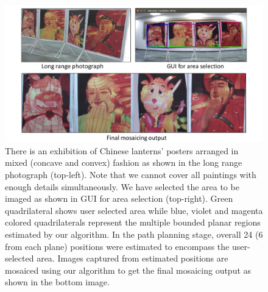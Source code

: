 \begin{figure}
\centering
\includegraphics[width=\linewidth]{figures/multiplanar/mixed2Result.pdf}
\caption[Result: Mixed arrangement]{There is an exhibition of Chinese lanterns'
posters arranged in mixed (concave and convex) fashion as shown in the long range photograph
(top-left). Note that we cannot cover all paintings with enough details
simultaneously. We have selected the area to be imaged as shown in GUI for
area selection (top-right). Green quadrilateral shows user selected area while
blue, violet and magenta colored quadrilaterals represent the multiple
bounded planar regions estimated by our algorithm. In the path planning
stage, overall 24 (6 from each plane) positions were estimated to encompass the
user-selected area. Images captured from estimated positions are mosaiced using
our algorithm to get the final mosaicing output as shown in the bottom image.}
\label{fig:resultMixed2}
\end{figure}

